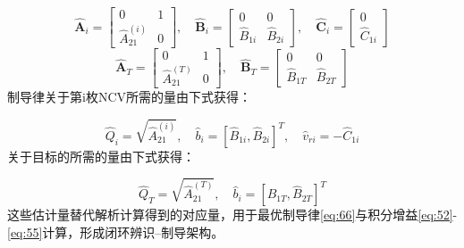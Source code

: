 \begin{equation}
\label{eq:39}
\hat{\mathbf{A}}_{i} = \left[ {\begin{array}{*{20}{c}}
  0&1 \\ 
  {\hat A_{21}^{(i)}}&0 
\end{array}} \right],\quad \hat{\mathbf{B}}_{i} = \left[ {\begin{array}{*{20}{c}}
  0&0 \\ 
  {{{\hat B}_{1i}}}&{{{\hat B}_{2i}}} 
\end{array}} \right],\quad \hat{\mathbf{C}}_{i} = \left[ {\begin{array}{*{20}{c}}
  0 \\ 
  {{{\hat C}_{1i}}} 
\end{array}} \right]
\end{equation}
\begin{equation}
\label{eq:40}
\hat{\mathbf{A}}_{T} = \left[ {\begin{array}{*{20}{c}}
  0&1 \\ 
  {\hat A_{21}^{(T)}}&0 
\end{array}} \right],\quad \hat{\mathbf{B}}_{T} = \left[ {\begin{array}{*{20}{c}}
  0&0 \\ 
  {{{\hat B}_{1T}}}&{{{\hat B}_{2T}}} 
\end{array}} \right]
\end{equation}
制导律关于第i枚NCV所需的量由下式获得：

\begin{equation}
\label{eq:41}
\hat{Q}_{i} = \sqrt {\hat A_{21}^{(i)}} ,\quad \hat{b}_{i} = {\left[ {{{\hat B}_{1i}},{{\hat B}_{2i}}} \right]^T},\quad \hat{v}_{ri} =  - \hat{C}_{1i}
\end{equation}
关于目标的所需的量由下式获得：

\begin{equation}
\label{eq:42}
\hat{Q}_{T} = \sqrt {\hat A_{21}^{(T)}} ,\quad \hat{b}_{i} = {\left[ {{{\hat B}_{1T}},{{\hat B}_{2T}}} \right]^T}
\end{equation}
这些估计量替代解析计算得到的对应量，用于最优制导律\eqref{eq:66}与积分增益\eqref{eq:52}-\eqref{eq:55}计算，形成闭环辨识–制导架构。

